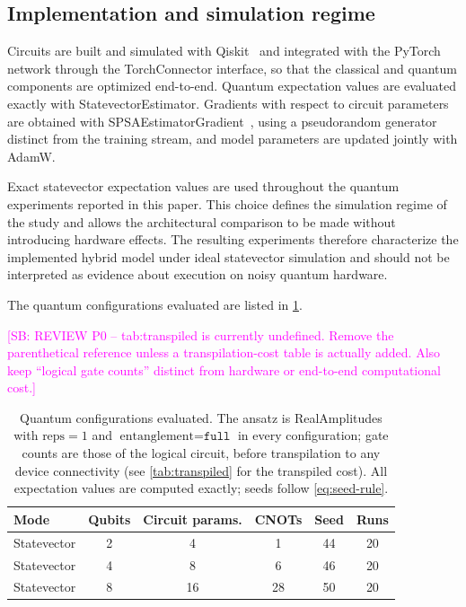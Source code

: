 \documentclass[aps,floatfix,superscriptaddress,twocolumn,tightenlines,amsmath,amssymb,nofootinbib,10pt,longbibliography,prl]{revtex4-2}
\newcommand{\sam}[1]{\textcolor{magenta}{[SB: {#1}]}}
\begin{document}
\subsection{Implementation and simulation regime}
\label{subsec:implementation}

Circuits are built and simulated with Qiskit~\cite{qiskit2024} and integrated with the PyTorch network through the TorchConnector interface, so that the classical and quantum components are optimized end-to-end. Quantum expectation values are evaluated exactly with StatevectorEstimator. Gradients with respect to circuit parameters are obtained with SPSAEstimatorGradient~\cite{spall1992}, using a pseudorandom generator distinct from the training stream, and model parameters are updated jointly with AdamW.

Exact statevector expectation values are used throughout the quantum experiments reported in this paper. This choice defines the simulation regime of the study and allows the architectural comparison to be made without introducing hardware effects. The resulting experiments therefore characterize the implemented hybrid model under ideal statevector simulation and should not be interpreted as evidence about execution on noisy quantum hardware.

The quantum configurations evaluated are listed in \ref{tab:quantum-configs}.

\begin{table}[htbp]
  \centering
  \caption{Quantum configurations evaluated. The ansatz is RealAmplitudes with $\text{reps} = 1$ and $\text{entanglement} = \texttt{full}$ in every configuration; gate counts are those of the logical circuit, before transpilation to any device connectivity (see \ref{tab:transpiled} for the transpiled cost). All expectation values are computed exactly; seeds follow \ref{eq:seed-rule}.}
\sam{REVIEW P0 -- tab:transpiled is currently undefined. Remove the parenthetical reference unless a transpilation-cost table is actually added. Also keep ``logical gate counts'' distinct from hardware or end-to-end computational cost.}
  \label{tab:quantum-configs}
  \begin{tabular}{lccccc}
    \toprule
    Mode & Qubits & Circuit params. & CNOTs & Seed & Runs \\
    \midrule
    Statevector & 2 & 4  & 1  & 44 & 20 \\
    Statevector & 4 & 8  & 6  & 46 & 20 \\
    Statevector & 8 & 16 & 28 & 50 & 20 \\
    \bottomrule
  \end{tabular}
\end{table}
\end{document}
